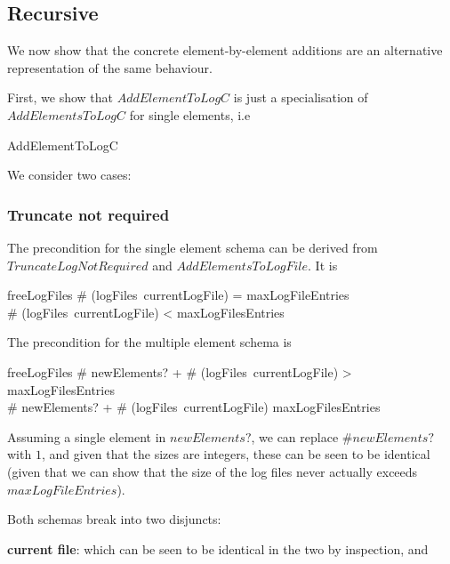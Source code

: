 \subsection{Recursive}
\label{refine:Rec}
We now show that the concrete element-by-element additions are an alternative representation
of the same behaviour.

First, we show that $AddElementToLogC$ is just a specialisation of $AddElementsToLogC$
for single elements, i.e 

\begin{argue}
	[AddElementsToLogC | \# newElements? = 1] \equiv AddElementToLogC
\end{argue}

 We consider two cases:
\subsubsection{Truncate not required}
\label{refine:truncNot}
The precondition for the single element schema can be derived from
$TruncateLogNotRequired$ and $AddElementsToLogFile$.
It is

\begin{argue}
	freeLogFiles \neq \emptyset
	\land \# (logFiles~currentLogFile) = maxLogFileEntries
\\ 	\lor \# (logFiles~currentLogFile) < maxLogFilesEntries
\end{argue}

The precondition for the multiple element schema is

\begin{argue}
	freeLogFiles \neq \emptyset
 	\land \# newElements? + \# (logFiles~currentLogFile) > maxLogFilesEntries
\\ 	\lor \# newElements? + \# (logFiles~currentLogFile) \leq maxLogFilesEntries
\end{argue}
Assuming a single element in $newElements?$, 
we can replace $\# newElements?$ with $1$,
and given that the sizes are integers,
these can be seen to be identical
(given that we can show that the size of the log files never actually exceeds
$maxLogFileEntries$).

Both schemas break into two disjuncts:

{\bf current file}:
which can be seen to be identical in the two by inspection, and

